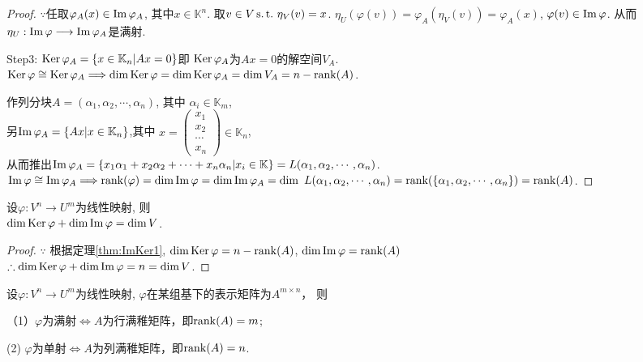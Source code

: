 \begin{proof}
  $\because$任取$ \varphi_A(x) \in \operatorname{Im}\varphi_A  $, 其中$x \in \mathbb{K}^n$.
  取$ v \in V \operatorname{s.t.{}} \eta_V(v) = x $.
  $ \eta_U(\varphi(v)) = \varphi_A(\eta_V(v)) = \varphi_A(x) $,
  $ \varphi(v) \in \operatorname{Im}\varphi $. 从而
  $ \eta_U: \operatorname{Im}\varphi \longrightarrow \operatorname{Im}\varphi_A $是满射.

  Step3: $ \operatorname{Ker}\varphi_A =\{x \in \mathbb{K}_n|Ax=0\} $即
  $ \operatorname{Ker}\varphi_A $为$ Ax=0 $的解空间$ V_A $.\\
  $ \operatorname{Ker}\varphi \cong \operatorname{Ker}\varphi_A \Longrightarrow
  \operatorname{dim}\operatorname{Ker}\varphi = \operatorname{dim}\operatorname{Ker}\varphi_A = \operatorname{dim} V_A = n-\operatorname{rank}(A)$.

  作列分块$ A = (\alpha_1,\alpha_2,\cdots,\alpha_n) $, 其中
  $ \alpha_i \in \mathbb{K}_m$,\\
  另$ \operatorname{Im}\varphi_A = \{Ax|x \in \mathbb{K}_n\} $,其中  
  $ x = \left(\begin{smallmatrix}
    x_1\\
    x_2\\
    \cdots\\
    x_n \end{smallmatrix}\right) \in \mathbb{K}_n $, \\
  从而推出$ \operatorname{Im}\varphi_A = \{
  x_1\alpha_1+x_2\alpha_2+\cdots+x_n\alpha_n|x_i \in \mathbb{K}\}
  = L(\alpha_1, \alpha_2, \cdots, \alpha_n)$.\\
  $ \operatorname{Im}\varphi \cong \operatorname{Im}\varphi_A \Longrightarrow
  \operatorname{rank}(\varphi) = \operatorname{dim}\operatorname{Im}\varphi = \operatorname{dim}\operatorname{Im}\varphi_A
  = \operatorname{dim}\ L(\alpha_1, \alpha_2, \cdots, \alpha_n)\\
  = \operatorname{rank}(\{\alpha_1, \alpha_2, \cdots, \alpha_n\}) = \operatorname{rank}(A) $.
\end{proof}

\begin{deduction}[线性映射的维数公式]\label{thm:ImKer2}
  设$\varphi: V^n \longrightarrow U^m$为线性映射, 则\\
  $\operatorname{dim}\operatorname{Ker}\varphi + \operatorname{dim}\operatorname{Im}\varphi = \operatorname{dim} V$.
\end{deduction}

\begin{proof}
  $\because$ 根据定理\ref{thm:ImKer1}, $\operatorname{dim}\operatorname{Ker}\varphi = n - \operatorname{rank}(A)$,
  $\operatorname{dim}\operatorname{Im}\varphi = \operatorname{rank}(A)$\\
  $\therefore \operatorname{dim}\operatorname{Ker}\varphi + \operatorname{dim}\operatorname{Im}\varphi = n = \operatorname{dim} V$.
\end{proof}

\begin{deduction}
  设$\varphi: V^n \longrightarrow U^m$为线性映射,
  $\varphi$在某组基下的表示矩阵为$A^{m \times n}$， 则

  （1）$\varphi$为满射$\Longleftrightarrow A$为行满稚矩阵，即$\operatorname{rank}(A) = m$;

   (2) $\varphi$为单射$\Longleftrightarrow A$为列满稚矩阵，即$\operatorname{rank}(A) = n$. 
 \end{deduction}

